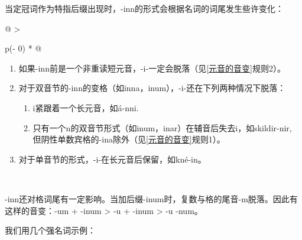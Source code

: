 当定冠词作为特指后缀出现时，-inn的形式会根据名词的词尾发生些许变化：

\begin{longtable}[]{@{}
  >{\raggedright\arraybackslash}p{(\columnwidth - 0\tabcolsep) * }@{}}
  \toprule\noalign{}
  \begin{minipage}[b]{\linewidth}\raggedright
    \begin{enumerate}
      \def\labelenumi{\arabic{enumi})}
      \item
            如果-inn前是一个非重读短元音，-i-一定会脱落（见\ref{元音的音变}规则2）。
      \item
            对于双音节的-inn的变格（如inna，inum），-i-还在下列两种情况下脱落：

            \begin{enumerate}
              \def\labelenumii{\roman{enumii}.}
              \item
                    i紧跟着一个长元音，如á-nni.
              \item
                    只有一个n的双音节形式（如inum，inar）在辅音后失去i，如skildir-nir,
                    但阴性单数宾格的-ina除外（见\ref{元音的音变}规则1）。
            \end{enumerate}
      \item
            对于单音节的形式，-i-在长元音后保留，如kné-in。
    \end{enumerate}
  \end{minipage} \\
  \midrule\noalign{}
  \endhead
  \bottomrule\noalign{}
  \endlastfoot
\end{longtable}

-inn还对格词尾有一定影响。当加后缀-inum时，复数与格的尾音-m脱落。因此有这样的音变：-um
+ -inum \textgreater{} -u + -inum \textgreater{} -u -num。

我们用几个强名词示例：

